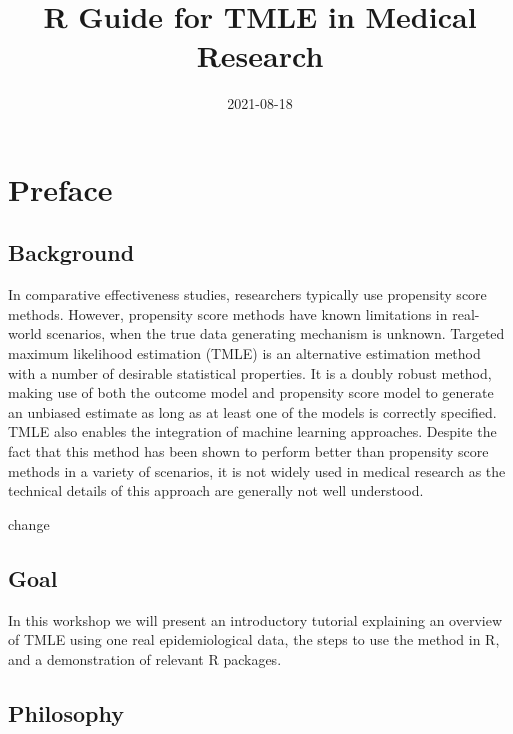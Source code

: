 \documentclass[
]{book}
\title{R Guide for TMLE in Medical Research}
\author{}
\date{\vspace{-2.5em}2021-08-18}
\begin{document}
\maketitle

{
\setcounter{tocdepth}{1}
\tableofcontents
}
\hypertarget{preface}{%
\chapter*{Preface}\label{preface}}

\hypertarget{background}{%
\section*{Background}\label{background}}

In comparative effectiveness studies, researchers typically use propensity score methods. However, propensity score methods have known limitations in real-world scenarios, when the true data generating mechanism is unknown. Targeted maximum likelihood estimation (TMLE) is an alternative estimation method with a number of desirable statistical properties. It is a doubly robust method, making use of both the outcome model and propensity score model to generate an unbiased estimate as long as at least one of the models is correctly specified. TMLE also enables the integration of machine learning approaches. Despite the fact that this method has been shown to perform better than propensity score methods in a variety of scenarios, it is not widely used in medical research as the technical details of this approach are generally not well understood.

change

\hypertarget{goal}{%
\section*{Goal}\label{goal}}

In this workshop we will present an introductory tutorial explaining an overview of TMLE using one real epidemiological data, the steps to use the method in R, and a demonstration of relevant R packages.~

\hypertarget{philosophy}{%
\section*{Philosophy}\label{philosophy}}
\end{document}
